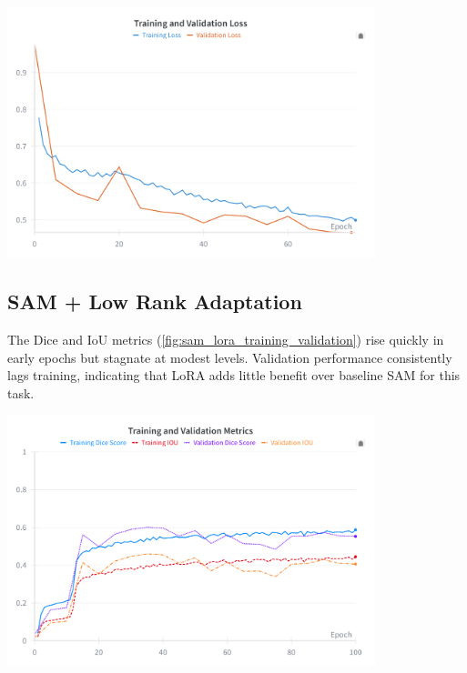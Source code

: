 \begin{center}
\includegraphics[width=0.8\textwidth]{figures/49_samv1_loss.png}
\label{fig:samv1_losses}
\end{center}


\subsection{SAM + Low Rank Adaptation}
\label{sec:sam_lora_plots}

The Dice and IoU metrics (\autoref{fig:sam_lora_training_validation}) rise quickly in early epochs but stagnate at modest levels. Validation performance consistently lags training, indicating that LoRA adds little benefit over baseline SAM for this task.

\begin{center}
\includegraphics[width=0.8\textwidth]{figures/51_sam_lora_metrics.png}
\label{fig:sam_lora_training_validation}
\end{center}


